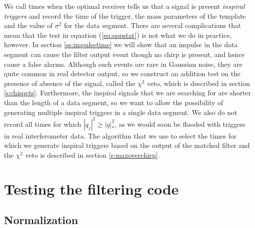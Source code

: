 We call times when the optimal receiver tells us that a signal is
present \emph{inspiral triggers} and record the time of the trigger,
the mass parameters of the template and the value of $\sigma^2$ for the data
segment. There are several complications that mean that the test in equation
(\ref{eq:qopstat}) is not what we do in practice, however. In section
\ref{ss:impulsetime} we will show that an impulse in the data segment can
cause the filter output event though no chirp is present, and hence cause a
false alarms. Although such events are rare in Gaussian noise, they are quite
common in real detector output, so we construct an addition test on the
presence of absence of the signal, called the $\chi^2$ veto\cite{Allen:2004},
which is described in section \ref{s:chisqcts}. Furthermore, the inspiral
signals that we are searching for are shorter than the length of
a data segment, so we want to allow the possibility of generating multiple
inspiral triggers in a single data segment. We also do not record all
times for which $|q_j|^2 \ge |q|^2_\ast$, as we would soon be flooded with
triggers in real interferometer data. The algorithm that we use to select the
times for which we generate inspiral triggers based on the output of the
matched filter and the $\chi^2$ veto is described in section
\ref{s:maxoverchirp}.

\section{Testing the filtering code}
\label{s:testing}

\subsection{Normalization}
\label{ss:normalization}


